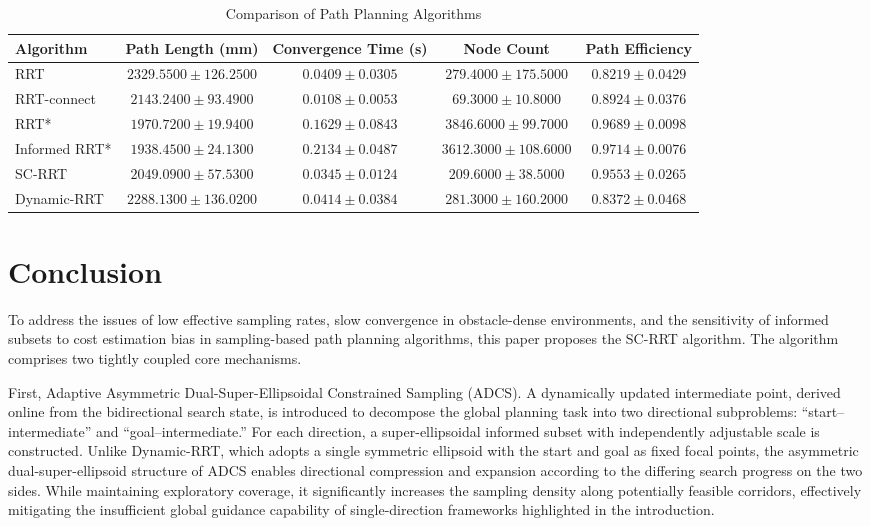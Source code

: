 \documentclass[sn-mathphys-num]{sn-jnl}%
\begin{document}
\begin{table}[h!]
\centering
\caption{Comparison of Path Planning Algorithms\label{tab:algo_comparison}}
\begin{tabular}{@{\extracolsep{\fill}}lcccc}
\hline
Algorithm & Path Length (mm) & Convergence Time (s) & Node Count & Path Efficiency\\
\hline
RRT & $2329.5500 \pm 126.2500$ & $0.0409 \pm 0.0305$ & $279.4000 \pm 175.5000$ & $0.8219 \pm 0.0429$\\
RRT-connect & $2143.2400 \pm 93.4900$ & $0.0108 \pm 0.0053$ & $69.3000 \pm 10.8000$ & $0.8924 \pm 0.0376$\\
RRT* & $1970.7200 \pm 19.9400$ & $0.1629 \pm 0.0843$ & $3846.6000 \pm 99.7000$ & $0.9689 \pm 0.0098$\\
Informed RRT* & $1938.4500 \pm 24.1300$ & $0.2134 \pm 0.0487$ & $3612.3000 \pm 108.6000$ & $0.9714 \pm 0.0076$\\
SC-RRT & $2049.0900 \pm 57.5300$ & $0.0345 \pm 0.0124$ & $209.6000 \pm 38.5000$ & $0.9553 \pm 0.0265$\\
Dynamic-RRT & $2288.1300 \pm 136.0200$ & $0.0414 \pm 0.0384$ & $281.3000 \pm 160.2000$ & $0.8372 \pm 0.0468$\\
\hline
\end{tabular}
\end{table}


\section{Conclusion}\label{sec5}

To address the issues of low effective sampling rates, slow convergence in obstacle-dense environments, and the sensitivity of informed subsets to cost estimation bias in sampling-based path planning algorithms, this paper proposes the SC-RRT algorithm. The algorithm comprises two tightly coupled core mechanisms.

First, Adaptive Asymmetric Dual-Super-Ellipsoidal Constrained Sampling (ADCS). A dynamically updated intermediate point, derived online from the bidirectional search state, is introduced to decompose the global planning task into two directional subproblems: ``start--intermediate'' and ``goal--intermediate.'' For each direction, a super-ellipsoidal informed subset with independently adjustable scale is constructed. Unlike Dynamic-RRT, which adopts a single symmetric ellipsoid with the start and goal as fixed focal points, the asymmetric dual-super-ellipsoid structure of ADCS enables directional compression and expansion according to the differing search progress on the two sides. While maintaining exploratory coverage, it significantly increases the sampling density along potentially feasible corridors, effectively mitigating the insufficient global guidance capability of single-direction frameworks highlighted in the introduction.
\end{document}
